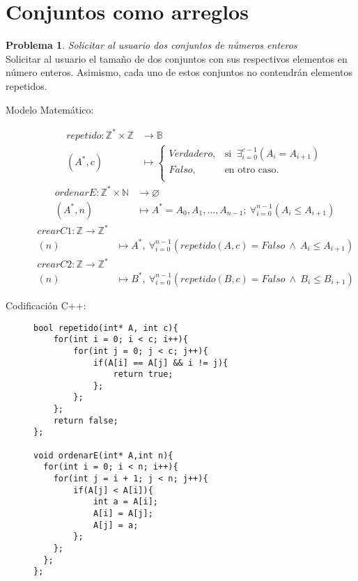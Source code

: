 \documentclass{article}
\theoremstyle{plain}
\theoremstyle{definition}
\newtheorem{problem}{Problema}
\begin{document}
\section{Conjuntos como arreglos}
\begin{problem}\emph{Solicitar al usuario dos conjuntos de números enteros}\\
Solicitar al usuario el tamaño de dos conjuntos con sus respectivos elementos en número enteros. Asimismo, cada uno de estos conjuntos no contendrán elementos repetidos.
\begin{description}
\item[Modelo Matemático:]
%
\begin{align*}
repetido: \mathbb{Z}^*\times\mathbb{Z}&\to \mathbb{B}\\
(A^*,c) &\mapsto
\begin{cases}
Verdadero, &\text{si }\ \exists_{i=0}^{c-1}(A_i=A_{i+1})\\
Falso, &\text{en otro caso}.\\
\end{cases}
\end{align*}
%
\begin{align*}
ordenarE: \mathbb{Z}^*\times\mathbb{N}&\to \varnothing
\\
(A^*,n) &\mapsto
A^*=A_0,A_1,...,A_{n-1};\ \forall_{i=0}^{n-1}(A_i \leq A_{i+1})
\end{align*}
%
\begin{align*}
crearC1: \mathbb{Z}\to \mathbb{Z}^*\\
(n) &\mapsto A^*,\  \forall_{i=0}^{n-1} (repetido(A,c)=Falso \ \land \ A_i \leq A_{i+1})
\end{align*}
%
\begin{align*}
crearC2: \mathbb{Z}\to \mathbb{Z}^*\\
(n) &\mapsto B^*,\  \forall_{i=0}^{n-1} (repetido(B,c)=Falso \ \land \ B_i \leq B_{i+1})
\end{align*}
%
\item[Codificación \textsf{C++}:]\hfill
\begin{verbatim}
bool repetido(int* A, int c){
    for(int i = 0; i < c; i++){
        for(int j = 0; j < c; j++){
            if(A[i] == A[j] && i != j){
                return true;
            };
        };
    };
    return false;
};

void ordenarE(int* A,int n){
  for(int i = 0; i < n; i++){
    for(int j = i + 1; j < n; j++){
        if(A[j] < A[i]){
            int a = A[i];
            A[i] = A[j];
            A[j] = a;
        };
    };
  };
};


\end{verbatim}
\end{description}
\end{problem}
\end{document}
